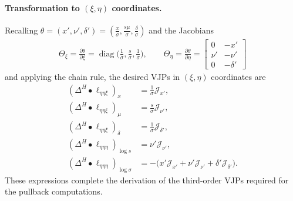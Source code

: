 \documentclass{article}
\begin{document}
\paragraph{Transformation to $(\xi,\eta)$ coordinates.}

Recalling $\theta = (x', \nu', \delta') = (\frac{x}{\sigma}, \frac{s\mu}{\sigma}, \frac{\delta}{\sigma})$ and the Jacobians
%
\begin{align}
  \Theta_\xi = \frac{\partial \theta}{\partial \xi} = \operatorname{diag}\Big(\frac{1}{\sigma}, \frac{s}{\sigma}, \frac{1}{\sigma}\Big),
  \qquad
  \Theta_\eta = \frac{\partial \theta}{\partial \eta} = \begin{bmatrix} 0 & -x' \\ \nu' & -\nu' \\ 0 & -\delta' \end{bmatrix}
\end{align}
%
and applying the chain rule, the desired VJPs in $(\xi,\eta)$ coordinates are
%
\begin{align}
  (\Delta^H \bullet \ell_{\eta\eta\xi})_x              & = \frac{1}{\sigma} \mathcal{J}_{x'},                                                          \\
  (\Delta^H \bullet \ell_{\eta\eta\xi})_\mu            & = \frac{s}{\sigma} \mathcal{J}_{\nu'},                                                        \\
  (\Delta^H \bullet \ell_{\eta\eta\xi})_\delta         & = \frac{1}{\sigma} \mathcal{J}_{\delta'},                                                     \\
  (\Delta^H \bullet \ell_{\eta\eta\eta})_{\log s}      & = \nu' \mathcal{J}_{\nu'},                                                                    \\
  (\Delta^H \bullet \ell_{\eta\eta\eta})_{\log \sigma} & = -\big( x' \mathcal{J}_{x'} + \nu' \mathcal{J}_{\nu'} + \delta' \mathcal{J}_{\delta'} \big).
\end{align}
%
These expressions complete the derivation of the third-order VJPs required for the pullback computations.
\end{document}

